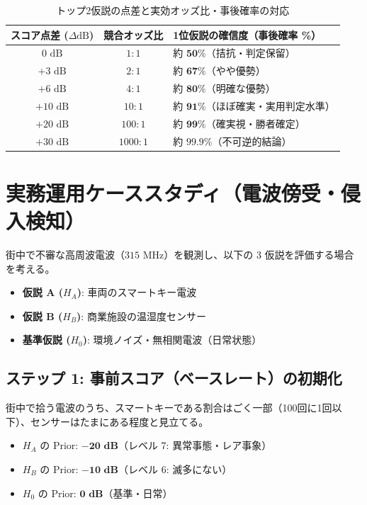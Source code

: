 \begin{table}[htbp]
\centering
\caption{トップ2仮説の点差と実効オッズ比・事後確率の対応}
\vspace{2mm}
\begin{tabular}{ccl}
\toprule
スコア点差 ($\Delta\text{dB}$) & 競合オッズ比 & 1位仮説の確信度（事後確率 \%） \\
\midrule
$0\text{ dB}$   & $1 : 1$   & 約 $\mathbf{50\%}$（拮抗・判定保留） \\
$+3\text{ dB}$  & $2 : 1$   & 約 $\mathbf{67\%}$（やや優勢） \\
$+6\text{ dB}$  & $4 : 1$   & 約 $\mathbf{80\%}$（明確な優勢） \\
$+10\text{ dB}$ & $10 : 1$  & 約 $\mathbf{91\%}$（ほぼ確実・実用判定水準） \\
$+20\text{ dB}$ & $100 : 1$ & 約 $\mathbf{99\%}$（確実視・勝者確定） \\
$+30\text{ dB}$ & $1000 : 1$& 約 $\mathbf{99.9\%}$（不可逆的結論） \\
\bottomrule
\end{tabular}
\end{table}

\section{実務運用ケーススタディ（電波傍受・侵入検知）}

街中で不審な高周波電波（$315\text{ MHz}$）を観測し、以下の 3 仮説を評価する場合を考える。
\begin{itemize}
    \item \textbf{仮説 A ($H_A$)}: 車両のスマートキー電波
    \item \textbf{仮説 B ($H_B$)}: 商業施設の温湿度センサー
    \item \textbf{基準仮説 ($H_0$)}: 環境ノイズ・無相関電波（日常状態）
\end{itemize}

\subsection{ステップ 1: 事前スコア（ベースレート）の初期化}
街中で拾う電波のうち、スマートキーである割合はごく一部（100回に1回以下）、センサーはたまにある程度と見立てる。
\begin{itemize}
    \item $H_A$ の Prior: $\mathbf{-20\text{ dB}}$（レベル 7: 異常事態・レア事象）
    \item $H_B$ の Prior: $\mathbf{-10\text{ dB}}$（レベル 6: 滅多にない）
    \item $H_0$ の Prior: $\mathbf{0\text{ dB}}$（基準・日常）
\end{itemize}

